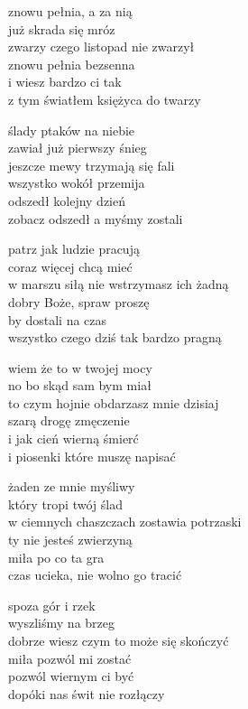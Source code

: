 \begin{text}
    znowu pełnia, a za nią\\
    już skrada się mróz	\\
    zwarzy czego listopad nie zwarzył\\
    znowu pełnia bezsenna\\
    i wiesz bardzo ci tak\\
    z tym światłem księżyca do twarzy

    \vin ślady ptaków na niebie\\
    \vin zawiał już pierwszy śnieg\\
    \vin jeszcze mewy trzymają się fali\\
    \vin wszystko wokół przemija\\
    \vin odszedł kolejny dzień\\
    \vin zobacz odszedł a myśmy zostali

    patrz jak ludzie pracują\\
    coraz więcej chcą mieć\\
    w marszu siłą nie wstrzymasz ich żadną\\
    dobry Boże, spraw proszę\\
    by dostali na czas\\
    wszystko czego dziś tak bardzo pragną

    \vin wiem że to w twojej mocy\\
    \vin no bo skąd sam bym miał\\
    \vin to czym hojnie obdarzasz mnie dzisiaj\\
    \vin szarą drogę zmęczenie\\
    \vin i jak cień wierną śmierć\\
    \vin i piosenki które muszę napisać

    żaden ze mnie myśliwy\\
    który tropi twój ślad\\
    w ciemnych chaszczach zostawia potrzaski\\
    ty nie jesteś zwierzyną\\
    miła po co ta gra\\
    czas ucieka, nie wolno go tracić

    \vin spoza gór i rzek\\
    \vin wyszliśmy na brzeg\\
    \vin dobrze wiesz czym to może się skończyć\\
    \vin miła pozwól mi zostać\\
    \vin pozwól wiernym ci być\\
    \vin dopóki nas świt nie rozłączy
\end{text}

